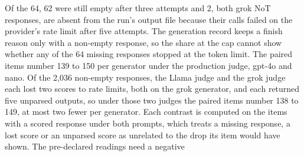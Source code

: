 Of the 64, 62 were still empty after three attempts and 2, both grok NoT
responses, are absent from the run's output file because their calls failed
on the provider's rate limit after five attempts.
The generation record keeps a finish reason only with a non-empty response,
so the share at the cap cannot show whether any of the 64 missing responses
stopped at the token limit.
The paired items number 139 to 150 per generator under the production judge,
gpt-4o and nano. Of the 2,036 non-empty responses, the Llama judge and the
grok judge each lost two scores to rate limits, both on the grok generator,
and each returned five unparsed outputs, so under those two judges the paired
items number 138 to 149, at most two fewer per generator. Each contrast is
computed on the items with a scored response under both prompts, which treats
a missing response, a lost score or an unparsed score as unrelated to the
drop its item would have shown. The pre-declared readings need a negative
